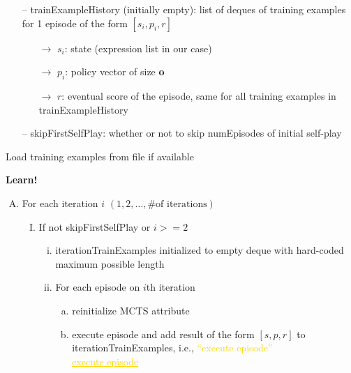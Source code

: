 \documentclass[12pt]{article}
\begin{document}
\begin{redenum}
\begin{itemize}
\begin{itemize}
\begin{itemize}
			\end{itemize}
		\end{itemize}
	\item[--] trainExampleHistory (initially empty): list of deques of training examples for 1 episode of the form $\left[s_i, p_i, r\right]$
		\begin{itemize}
			\item[$\rightarrow$] $s_i$: state (expression list in our case)
			\item[$\rightarrow$] $p_i$: policy vector of size \textbf{o}
			\item[$\rightarrow$] $r$: eventual score of the episode, same for all training examples in trainExampleHistory
		\end{itemize}
	\item[--] skipFirstSelfPlay: whether or not to skip numEpisodes of initial self-play
	\end{itemize}
\item Load training examples from file if available
\item \textbf{Learn!}
	\begin{enumerate}[A.)]
		\item For each iteration $i$ $\left(1, 2, \ldots,\text{\# of iterations}\right)$
		\begin{enumerate}[I.)]
			\item If not skipFirstSelfPlay or $i >= 2$
			\begin{enumerate}[i.)]
				\item iterationTrainExamples initialized to empty deque with hard-coded maximum possible length
				\item For each episode on $i$th iteration
				\begin{enumerate}[a.)]
					\item reinitialize MCTS attribute
					\item execute episode and add result of the form $\left[s, p, r\right]$ to iterationTrainExamples, i.e.,  \textcolor{gold}{``execute episode''} \\[0.2cm]
					\textcolor{gold}{\underline{execute episode}} 
\end{enumerate}
\end{enumerate}
\end{enumerate}
\end{enumerate}
\end{redenum}
\end{document}
